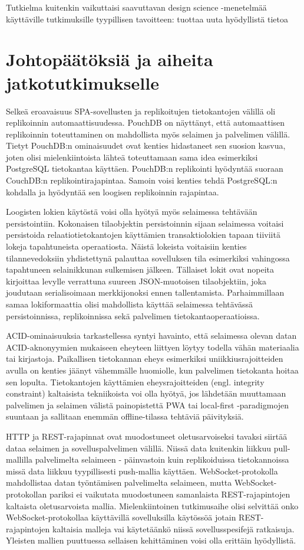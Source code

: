 \documentclass[finnish,twoside,censored,csm,sw-track-2018]{HYthesisML}
\begin{document}
Tutkielma kuitenkin vaikuttaisi saavuttavan design science -menetelmää käyttäville tutkimuksille tyypillisen \citep{van-aken} tavoitteen: tuottaa uuta hyödyllistä tietoa 
\section{Johtopäätöksiä ja aiheita jatkotutkimukselle}

Selkeä eroavaisuus SPA-sovellusten ja replikoitujen tietokantojen välillä oli replikoinnin automaattisuudessa. PouchDB on näyttänyt, että automaattisen replikoinnin toteuttaminen on mahdollista myös selaimen ja palvelimen välillä. Tietyt PouchDB:n ominaisuudet ovat kenties hidastaneet sen suosion kasvua, joten olisi mielenkiintoista lähteä toteuttamaan sama idea esimerkiksi PostgreSQL tietokantaa käyttäen. PouchDB:n replikointi hyödyntää suoraan CouchDB:n replikointirajapintaa. Samoin voisi kenties tehdä PostgreSQL:n kohdalla ja hyödyntää sen loogisen replikoinnin rajapintaa.

Loogisten lokien käytöstä voisi olla hyötyä myös selaimessa tehtävään persistointiin. Kokonaisen tilaobjektin persistoinnin sijaan selaimessa voitaisi persistoida relaatiotietokantojen käyttämien transaktiolokien tapaan tiiviitä lokeja tapahtuneista operaatiosta. Näistä lokeista voitaisiin kenties tilannevedoksiin yhdistettynä palauttaa sovelluksen tila esimerkiksi vahingossa tapahtuneen selainikkunan sulkemisen jälkeen. Tällaiset lokit ovat nopeita kirjoittaa levylle verrattuna suureen JSON-muotoisen tilaobjektiin, joka joudutaan serialisoimaan merkkijonoksi ennen tallentamista. Parhaimmillaan samaa lokiformaattia olisi mahdollista käyttää selaimessa tehtävässä persistoinnissa, replikoinnissa sekä palvelimen tietokantaoperaatioissa.

ACID-ominaisuuksia tarkastellessa syntyi havainto, että selaimessa olevan datan ACID-aknonyymien mukaiseen eheyteen liittyen löytyy todella vähän materiaalia tai kirjastoja. Paikallisen tietokannan eheys esimerkiksi uniikkiusrajoitteiden avulla on kenties jäänyt vähemmälle huomiolle, kun palvelimen tietokanta hoitaa sen lopulta.  Tietokantojen käyttämien eheysrajoitteiden (engl. integrity constraint) kaltaisista tekniikoista voi olla hyötyä, jos lähdetään muuttamaan palvelimen ja selaimen välistä painopistettä PWA tai local-first -paradigmojen suuntaan ja sallitaan enemmän offline-tilassa tehtäviä päivityksiä.

HTTP ja REST-rajapinnat ovat muodostuneet oletusarvoiseksi tavaksi siirtää dataa selaimen ja sovelluspalvelimen välillä. Niissä data kuitenkin liikkuu pull-mallilla palvelimelta selaimeen - päinvastoin kuin replikoiduissa tietokannoissa missä data liikkuu tyypillisesti push-mallia käyttäen. WebSocket-protokolla mahdollistaa datan työntämisen palvelimelta selaimeen, mutta WebSocket-protokollan pariksi ei vaikutata muodostuneen samanlaista REST-rajapintojen kaltaista oletusarvoista mallia. Mielenkiintoinen tutkimusaihe olisi selvittää onko WebSocket-protokollaa käyttävillä sovelluksilla käytössöä jotain REST-rajapintojen kaltaisia malleja vai käytetäänkö niissä sovellusspesifejä ratkaisuja. Yleisten mallien puuttuessa sellaisen kehittäminen voisi olla erittäin hyödyllistä.
\end{document}
